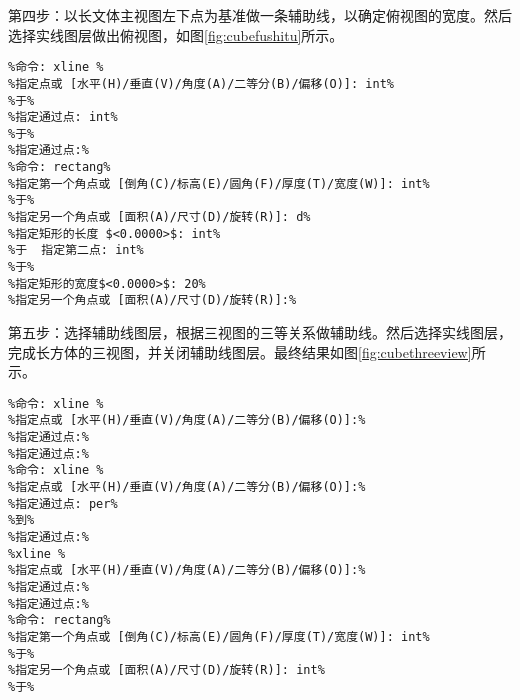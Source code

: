 第四步：以长文体主视图左下点为基准做一条辅助线，以确定俯视图的宽度。然后选择实线图层做出俯视图，如图\ref{fig:cubefushitu}所示。
\begin{lstlisting}
%命令: xline %
%指定点或 [水平(H)/垂直(V)/角度(A)/二等分(B)/偏移(O)]: int%
%于%
%指定通过点: int%
%于%
%指定通过点:%
%命令: rectang%
%指定第一个角点或 [倒角(C)/标高(E)/圆角(F)/厚度(T)/宽度(W)]: int%
%于%
%指定另一个角点或 [面积(A)/尺寸(D)/旋转(R)]: d%
%指定矩形的长度 $<0.0000>$: int%
%于  指定第二点: int%
%于%
%指定矩形的宽度$<0.0000>$: 20%
%指定另一个角点或 [面积(A)/尺寸(D)/旋转(R)]:%
\end{lstlisting}
\begin{figure}[htbp]
\centering
\begin{floatrow}
\end{floatrow}
\end{figure}

第五步：选择辅助线图层，根据三视图的三等关系做辅助线。然后选择实线图层，完成长方体的三视图，并关闭辅助线图层。最终结果如图\ref{fig:cubethreeview}所示。
\begin{lstlisting}
%命令: xline %
%指定点或 [水平(H)/垂直(V)/角度(A)/二等分(B)/偏移(O)]:%
%指定通过点:%
%指定通过点:%
%命令: xline %
%指定点或 [水平(H)/垂直(V)/角度(A)/二等分(B)/偏移(O)]:%
%指定通过点: per%
%到%
%指定通过点:%
%xline %
%指定点或 [水平(H)/垂直(V)/角度(A)/二等分(B)/偏移(O)]:%
%指定通过点:%
%指定通过点:%
%命令: rectang%
%指定第一个角点或 [倒角(C)/标高(E)/圆角(F)/厚度(T)/宽度(W)]: int%
%于%
%指定另一个角点或 [面积(A)/尺寸(D)/旋转(R)]: int%
%于%
\end{lstlisting}

